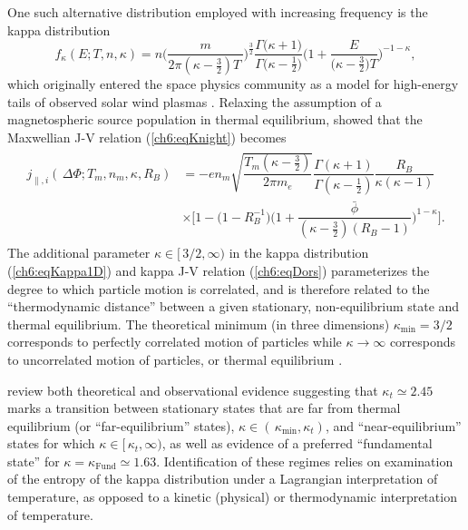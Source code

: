   One such alternative distribution employed with increasing frequency is the
  kappa distribution \citep{Livadiotis2013}
    \begin{equation} \label{ch6:eqKappa1D} f_{\kappa}(E; T, n, \kappa) = n \Bigg
      ( \dfrac{m}{2 \pi (\kappa - \frac{3}{2}) T \, } \Bigg
      )^{\frac{3}{2}} \dfrac{\Gamma \big ( \kappa + 1 \big ) }{\Gamma \big (
        \kappa - \frac{1}{2} \big ) } \Bigg ( 1 + \dfrac{E}{ \big ( \kappa -
        \frac{3}{2} \big ) T } \Bigg )^{-1 - \kappa},
    \end{equation}
   which originally entered the space physics community as a model for
   high-energy tails of observed solar wind plasmas
   \citep{Vasyliunas1968}. Relaxing the assumption of a magnetospheric source
   population in thermal equilibrium, \citet{Dors1999} showed that the
   Maxwellian J-V relation (\ref{ch6:eqKnight}) becomes
    \begin{align}
      \label{ch6:eqDors}
      \begin{array}{ll}
        j_{\parallel,i} ( \, \Delta \Phi ; T_m, n_m, \kappa, R_B ) &= - e n_m \sqrt{ \dfrac{ T_m (\kappa -
            \frac{3}{2})}{ 2 \pi m_e}} \dfrac{\Gamma (\kappa + 1)}{\Gamma (\kappa - \frac{1}{2})} \dfrac{R_B}{\kappa (\kappa - 1)} \\
        &\times \Bigg[1 - \Big(1 - R_B^{-1} \Big) \Bigg(1+\dfrac{\bar{\phi}}{ (\kappa - \frac{3}{2})(R_B - 1)} \Bigg)^{1-\kappa} \Bigg].
      \end{array}
    \end{align}
  The additional parameter $\kappa \in [ \, 3/2, \infty )$ in the kappa
  distribution (\ref{ch6:eqKappa1D}) and kappa J-V relation (\ref{ch6:eqDors})
  parameterizes the degree to which particle motion is correlated, and is
  therefore related to the ``thermodynamic distance'' between a given
  stationary, non-equilibrium state and thermal equilibrium. The theoretical
  minimum (in three dimensions) $\kappa_{\textrm{min}} = 3/2$ corresponds to
  perfectly correlated motion of particles while $\kappa \rightarrow \infty$
  corresponds to uncorrelated motion of particles, or thermal equilibrium
  \citep{Livadiotis2010,Livadiotis2011,Livadiotis2013}.

  \citet{Livadiotis2010} review both theoretical and observational evidence
  suggesting that $\kappa_t \simeq 2.45$ marks a transition between stationary
  states that are far from thermal equilibrium (or ``far-equilibrium'' states),
  $\kappa \in ( \, \kappa_{\textrm{min}}, \kappa_t )$, and ``near-equilibrium''
  states for which $\kappa \in [ \, \kappa_t, \infty )$, as well as evidence of
  a preferred ``fundamental state'' for
  $\kappa = \kappa_{\textrm{Fund}} \simeq 1.63$. Identification of these regimes
  relies on examination of the entropy of the kappa distribution under a
  Lagrangian interpretation of temperature, as opposed to a kinetic (physical)
  or thermodynamic interpretation of temperature.

